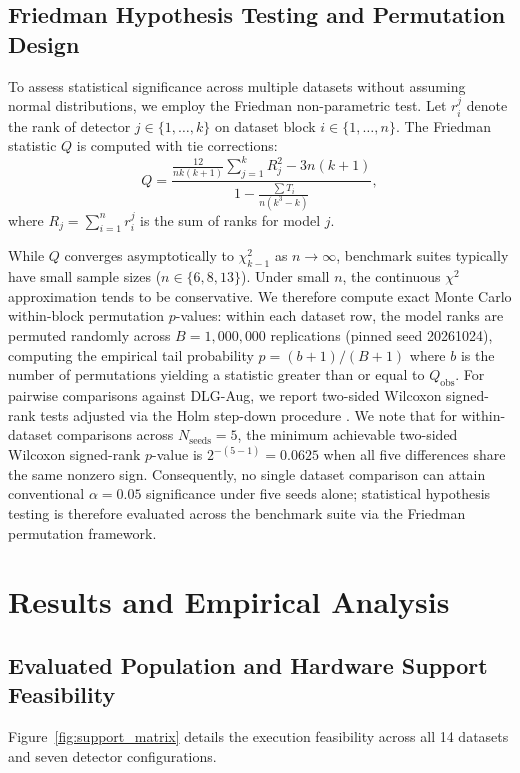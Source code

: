\documentclass[applsci,article,submit,moreauthors,pdftex]{Definitions/mdpi}
\begin{document}
\subsection{Friedman Hypothesis Testing and Permutation Design}
To assess statistical significance across multiple datasets without assuming normal distributions, we employ the Friedman non-parametric test. Let $r_i^j$ denote the rank of detector $j \in \{1, \dots, k\}$ on dataset block $i \in \{1, \dots, n\}$. The Friedman statistic $Q$ is computed with tie corrections:
\begin{equation}
Q = \frac{\frac{12}{n k (k+1)} \sum_{j=1}^k R_j^2 - 3 n (k+1)}{1 - \frac{\sum T_i}{n(k^3 - k)}},
\label{eq:friedman_q}
\end{equation}
where $R_j = \sum_{i=1}^n r_i^j$ is the sum of ranks for model $j$. 

While $Q$ converges asymptotically to $\chi^2_{k-1}$ as $n \to \infty$, benchmark suites typically have small sample sizes ($n \in \{6, 8, 13\}$). Under small $n$, the continuous $\chi^2$ approximation tends to be conservative. We therefore compute exact Monte Carlo within-block permutation $p$-values: within each dataset row, the model ranks are permuted randomly across $B=1,000,000$ replications (pinned seed 20261024), computing the empirical tail probability $p = (b + 1) / (B + 1)$ where $b$ is the number of permutations yielding a statistic greater than or equal to $Q_{\mathrm{obs}}$. For pairwise comparisons against DLG-Aug, we report two-sided Wilcoxon signed-rank tests adjusted via the Holm step-down procedure \cite{holm1979}. We note that for within-dataset comparisons across $N_{\mathrm{seeds}} = 5$, the minimum achievable two-sided Wilcoxon signed-rank $p$-value is $2^{-(5-1)} = 0.0625$ when all five differences share the same nonzero sign. Consequently, no single dataset comparison can attain conventional $\alpha = 0.05$ significance under five seeds alone; statistical hypothesis testing is therefore evaluated across the benchmark suite via the Friedman permutation framework.

\section{Results and Empirical Analysis}
\label{sec:results}

\subsection{Evaluated Population and Hardware Support Feasibility}
Figure~\ref{fig:support_matrix} details the execution feasibility across all 14 datasets and seven detector configurations.
\end{document}

